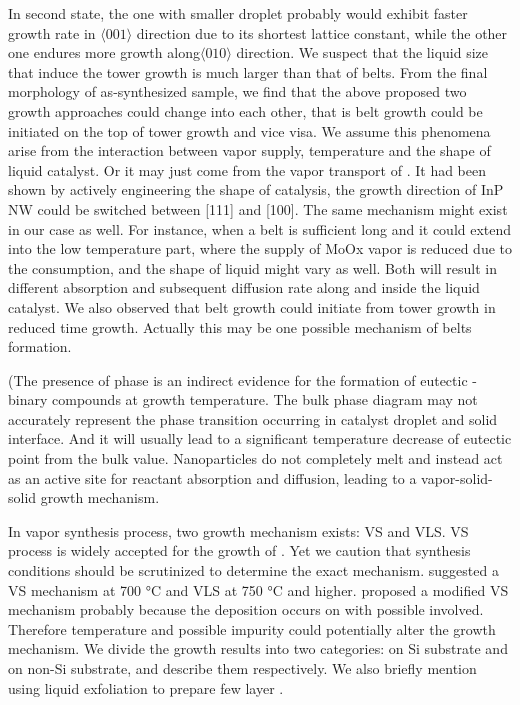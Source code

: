 In second state, the one with smaller droplet probably would exhibit faster growth rate in $\langle001\rangle$ direction due to its shortest lattice constant, while the other one endures more growth along$\langle010\rangle$ direction. We suspect that the liquid size that induce the tower growth is much larger than that of belts. From the final morphology of as-synthesized sample, we find that the above proposed two growth approaches could change into each other, that is belt growth could be initiated on the top of tower growth and vice visa. We assume this phenomena arise from the interaction between vapor supply, temperature and the shape of liquid catalyst. Or it may just come from the vapor transport of .
It had been shown by actively engineering the shape of catalysis, the growth direction of  InP NW could be switched between [111] and [100].\cite{Wang2013c} The same mechanism might exist in our case as well. For instance, when a belt is sufficient long and it could extend into the low temperature part, where the supply of MoOx vapor is reduced due to the consumption, and the shape of liquid might vary as well. Both will result in different absorption and subsequent diffusion rate along and inside the liquid catalyst. We also observed that belt growth could initiate from tower growth in reduced time growth. Actually this may be one possible mechanism of belts formation.

(The presence of  phase is an indirect evidence for the formation of eutectic -  binary compounds at growth temperature. The bulk phase diagram may not accurately represent the phase transition occurring in catalyst droplet and solid interface. And it will usually lead to a significant temperature decrease of eutectic point from the bulk value. Nanoparticles do not completely melt and instead act as an active site for reactant absorption and diffusion, leading to a vapor-solid-solid growth mechanism. 

In vapor synthesis process, two growth mechanism exists: VS and VLS. VS process is widely accepted for the growth of . Yet we caution that synthesis conditions should be scrutinized to determine the exact mechanism. \citeauthor{Li2002c} suggested a VS mechanism at 700 \si{\degreeCelsius} and VLS at 750 \si{\degreeCelsius} and higher.\cite{Li2002c} \citeauthor{Fibers2007} proposed a modified VS mechanism probably because the deposition occurs on  with possible  involved. Therefore temperature and possible impurity could potentially alter the growth mechanism. We divide the growth results into two categories: on Si substrate and on non-Si substrate, and describe them respectively. We also briefly mention using liquid exfoliation to prepare few layer .

